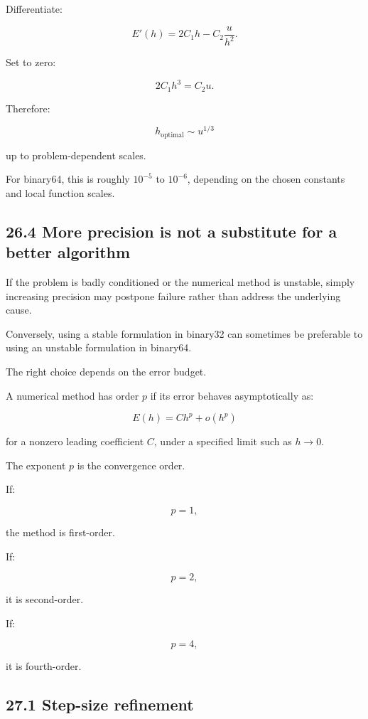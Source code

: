 Differentiate:

\[ E'(h)=2C_1h-C_2\frac u{h^2}. \]

Set to zero:

\[ 2C_1h^3=C_2u. \]

Therefore:

\[ \boxed{ h_{\mathrm{optimal}}\sim u^{1/3} } \]

up to problem-dependent scales.

For binary64, this is roughly \(10^{-5}\) to \(10^{-6}\), depending on the chosen constants and local function scales.

\subsection{26.4 More precision is not a substitute for a better algorithm}\label{02-foundations-ii-ch029-more-precision-is-not-a-substitute-for-a-better-algorithm}

\hypertarget{02-foundations-ii-ch029-more-precision-is-not-a-substitute-for-a-better-algorithm}{}

If the problem is badly conditioned or the numerical method is unstable, simply increasing precision may postpone failure rather than address the underlying cause.

Conversely, using a stable formulation in binary32 can sometimes be preferable to using an unstable formulation in binary64.

The right choice depends on the error budget.

A numerical method has order \(p\) if its error behaves asymptotically as:

\[ \boxed{ E(h)=Ch^p+o(h^p) } \]

for a nonzero leading coefficient \(C\), under a specified limit such as \(h\to0\).

The exponent \(p\) is the convergence order.

If:

\[ p=1, \]

the method is first-order.

If:

\[ p=2, \]

it is second-order.

If:

\[ p=4, \]

it is fourth-order.

\subsection{27.1 Step-size refinement}\label{02-foundations-ii-ch029-step-size-refinement}

